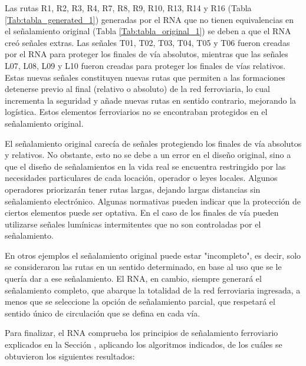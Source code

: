     Las rutas R1, R2, R3, R4, R7, R8, R9, R10, R13, R14 y R16 (Tabla \ref{Tab:tabla_generated_1}) generadas por el RNA que no tienen equivalencias en el señalamiento original (Tabla \ref{Tab:tabla_original_1}) se deben a que el RNA creó señales extras. Las señales T01, T02, T03, T04, T05 y T06 fueron creadas por el RNA para proteger los finales de vía absolutos, mientras que las señales L07, L08, L09 y L10 fueron creadas para proteger los finales de vías relativos. Estas nuevas señales constituyen nuevas rutas que permiten a las formaciones detenerse previo al final (relativo o absoluto) de la red ferroviaria, lo cual incrementa la seguridad y añade nuevas rutas en sentido contrario, mejorando la logística. Estos elementos ferroviarios no se encontraban protegidos en el señalamiento original.
    
    El señalamiento original carecía de señales protegiendo los finales de vía absolutos y relativos. No obstante, esto no se debe a un error en el diseño original, sino a que el diseño de señalamientos en la vida real se encuentra restringido por las necesidades particulares de cada locación, operador o leyes locales. Algunos operadores priorizarán tener rutas largas, dejando largas distancias sin señalamiento electrónico. Algunas normativas pueden indicar que la protección de ciertos elementos puede ser optativa. En el caso de los finales de vía pueden utilizarse señales lumínicas intermitentes que no son controladas por el señalamiento.
    
    En otros ejemplos el señalamiento original puede estar "incompleto", es decir, solo se consideraron las rutas en un sentido determinado, en base al uso que se le quería dar a ese señalamiento. El RNA, en cambio, siempre generará el señalamiento completo, que abarque la totalidad de la red ferroviaria ingresada, a menos que se seleccione la opción de señalamiento parcial, que respetará el sentido único de circulación que se defina en cada vía.    
    
    
    Para finalizar, el RNA comprueba los principios de señalamiento ferroviario explicados en la Sección \label{sec:validar_principios}, aplicando los algoritmos indicados, de los cuáles se obtuvieron los siguientes resultados:
    
